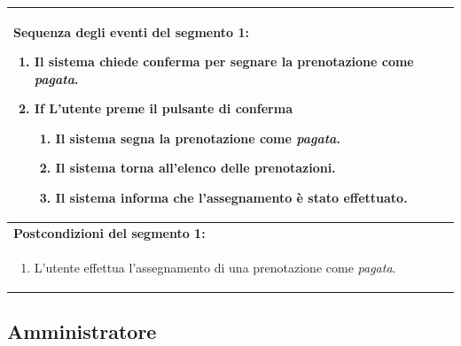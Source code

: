\documentclass{article}
\begin{document}
\begin{table}[H]
\begin{tabular}{|p{\linewidth}|}
                        \hline
                        \textbf{Sequenza degli eventi del segmento 1:}
                        \begin{enumerate}
                            \item Il sistema chiede conferma per segnare la prenotazione come \emph{pagata}.
                            \item \textbf{If} L'utente preme il pulsante di conferma
                            \begin{enumerate}
                                \item Il sistema segna la prenotazione come \emph{pagata}.
                                \item Il sistema torna all'elenco delle prenotazioni.
                                \item Il sistema informa che l'assegnamento è stato effettuato.
                            \end{enumerate}
                        \end{enumerate} \\
                        \hline
                        \cellcolor{gray!20}
                        \textbf{Postcondizioni del segmento 1:} \\
                        \cellcolor{gray!20}
                        \begin{minipage}{\linewidth}
                            \begin{enumerate}
                                \item L'utente effettua l'assegnamento di una prenotazione come \emph{pagata}.
                            \end{enumerate}
                        \end{minipage} \\
                        \hline
                    \end{tabular}
                \end{table}

        \subsection{Amministratore}
\end{document}
